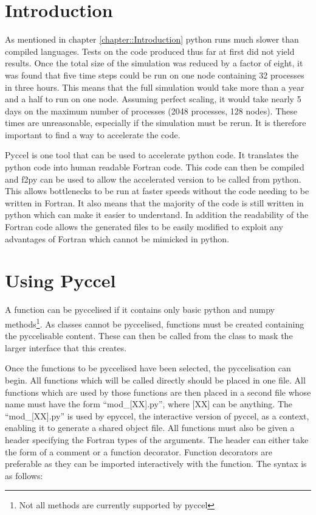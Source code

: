 
\section{Introduction}

As mentioned in chapter \ref{chapter::Introduction} python runs much slower than compiled languages. Tests on the code produced thus far at first did not yield results. Once the total size of the simulation was reduced by a factor of eight, it was found that five time steps could be run on one node containing 32 processes in three hours. This means that the full simulation would take more than a year and a half to run on one node. Assuming perfect scaling, it would take nearly 5 days on the maximum number of processes (2048 processes, 128 nodes). These times are unreasonable, especially if the simulation must be rerun. It is therefore important to find a way to accelerate the code.

Pyccel \cite{Pyccel} is one tool that can be used to accelerate python code. It translates the python code into human readable Fortran code. This code can then be compiled and f2py can be used to allow the accelerated version to be called from python. This allows bottlenecks to be run at faster speeds without the code needing to be written in Fortran. It also means that the majority of the code is still written in python which can make it easier to understand. In addition the readability of the Fortran code allows the generated files to be easily modified to exploit any advantages of Fortran which cannot be mimicked in python.

\section{Using Pyccel}

A function can be pyccelised if it contains only basic python and numpy methods\footnote{Not all methods are currently supported by pyccel}. As classes cannot be pyccelised, functions must be created containing the pyccelisable content. These can then be called from the class to mask the larger interface that this creates.

Once the functions to be pyccelised have been selected, the pyccelisation can begin. All functions which will be called directly should be placed in one file. All functions which are used by those functions are then placed in a second file whose name must have the form ``mod\_[XX].py'', where [XX] can be anything. The ``mod\_[XX].py'' is used by epyccel, the interactive version of pyccel, as a context, enabling it to generate a shared object file. All functions must also be given a header specifying the Fortran types of the arguments. The header can either take the form of a comment or a function decorator. Function decorators are preferable as they can be imported interactively with the function. The syntax is as follows:

